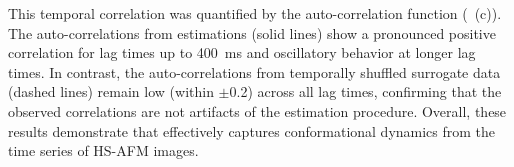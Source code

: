 This temporal correlation was quantified by the auto-correlation function (~(c)).
The auto-correlations from \Model estimations (solid lines) show a pronounced positive correlation for lag times up to 400~ms and oscillatory behavior at longer lag times.
In contrast, the auto-correlations from temporally shuffled surrogate data (dashed lines) remain low (within $\pm$0.2) across all lag times, confirming that the observed correlations are not artifacts of the estimation procedure.
Overall, these results demonstrate that \Model effectively captures conformational dynamics from the time series of HS-AFM images.
